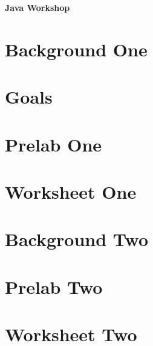 \documentclass{article}
\renewcommand{\maketitle}{
   \begin{center}
      {\Huge \bfseries Java Workshop}
   \end{center}
}
\begin{document}
\maketitle

\section{Background One}

\pagebreak

\section{Goals}

\pagebreak

\section{Prelab One}

\pagebreak

\section{Worksheet One}

\pagebreak

\section{Background Two}

\pagebreak

\section{Prelab Two}

\pagebreak

\section{Worksheet Two}

\pagebreak
\end{document}
